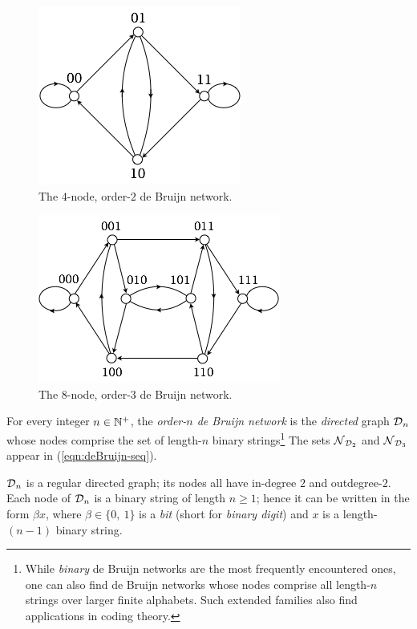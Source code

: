 \begin{figure}[hbt]
\begin{center}
       \includegraphics[scale=0.6]{FiguresGraph/dB2by2}
       \caption{The $4$-node, order-$2$ de Bruijn network.}
  \label{fig:dB2by2}
\end{center}
\end{figure}

\begin{figure}[hbt]
\begin{center}
       \includegraphics[scale=0.6]{FiguresGraph/dB2by3}
       \caption{The $8$-node, order-$3$ de Bruijn network.}
  \label{fig:dB2by3}
\end{center}
\end{figure}

For every integer $n \in \mathbb{N}^+$, the {\it order-$n$ de Bruijn network}
is the {\em directed} graph $\mbox{$\cal D$}_n$ whose nodes comprise the set of
length-$n$ binary strings\footnote{While {\em binary} de Bruijn
  networks are the most frequently encountered ones, one can also find
  de Bruijn networks whose nodes comprise all length-$n$ strings over
  larger finite alphabets.  Such extended families also find
  applications in coding theory.}  The sets $\mbox{$\cal N$}_{\mbox{{\scriptsize $\cal D$}}_2}$ and
$\mbox{$\cal N$}_{\mbox{{\scriptsize $\cal D$}}_3}$ appear in (\ref{eqn:deBruijn-seq}).


$\mbox{$\cal D$}_n$ is a regular directed graph; its nodes all have in-degree $2$
and outdegree-$2$.  Each node of $\mbox{$\cal D$}_n$ is a binary string of
length $n \geq 1$; hence it can be written in the form $\beta x$,
where $\beta \in \{0, \ 1\}$ is a {\it bit} (short for {\it binary
  digit}) and $x$ is a length-$(n-1)$ binary string.

